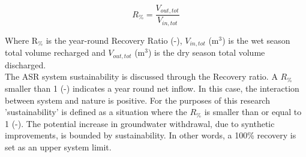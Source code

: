 \begin{equation}
 R_{\%} = \frac{V_{out,tot}}{V_{in,tot}}
\label{eq:RR}
\end{equation}

Where  R$_{\%}$ is the year-round Recovery Ratio (-), $V_{in,tot}$ (m$^3$) is the wet season total volume recharged and $V_{out,tot}$ (m$^3$) is the dry season total volume discharged. \\

The ASR system sustainability is discussed through the Recovery ratio. A $R_{\%}$ smaller than 1 (-) indicates a year round net inflow. In this case, the interaction between system and nature is positive. For the purposes of this research 'sustainability' is defined as a situation where the $R_{\%}$ is smaller than or equal to 1 (-). The potential increase in groundwater withdrawal, due to synthetic improvements, is bounded by sustainability. In other words, a 100\% recovery is set as an upper system limit. \\


